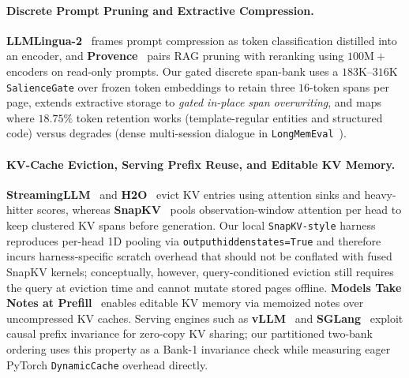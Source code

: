 \documentclass[11pt]{article}
\renewcommand{\_}{\origunderscore\allowbreak}
\begin{document}
\paragraph{Discrete Prompt Pruning and Extractive Compression.}
\textbf{LLMLingua-2}~\cite{pan2024llmlingua2} frames prompt compression as token classification distilled into an encoder, and \textbf{Provence}~\cite{chirkova2025provence} pairs RAG pruning with reranking using $100\text{M}+$ encoders on read-only prompts. Our gated discrete span-bank uses a $183\text{K}$--$316\text{K}$ \texttt{SalienceGate} over frozen token embeddings to retain three $16$-token spans per page, extends extractive storage to \emph{gated in-place span overwriting}, and maps where $18.75\%$ token retention works (template-regular entities and structured code) versus degrades (dense multi-session dialogue in \texttt{LongMemEval}~\cite{wu2025longmemeval}).

\paragraph{KV-Cache Eviction, Serving Prefix Reuse, and Editable KV Memory.}
\textbf{StreamingLLM}~\cite{xiao2024streamingllm} and \textbf{H2O}~\cite{zhang2023h2o} evict KV entries using attention sinks and heavy-hitter scores, whereas \textbf{SnapKV}~\cite{li2024snapkv} pools observation-window attention per head to keep clustered KV spans before generation. Our local \texttt{SnapKV-style} harness reproduces per-head 1D pooling via \texttt{output\_hidden\_states=True} and therefore incurs harness-specific scratch overhead that should not be conflated with fused SnapKV kernels; conceptually, however, query-conditioned eviction still requires the query at eviction time and cannot mutate stored pages offline. \textbf{Models Take Notes at Prefill}~\cite{li2026notes} enables editable KV memory via memoized notes over uncompressed KV caches. Serving engines such as \textbf{vLLM}~\cite{kwon2023vllm} and \textbf{SGLang}~\cite{zheng2024sglang} exploit causal prefix invariance for zero-copy KV sharing; our partitioned two-bank ordering uses this property as a Bank-1 invariance check while measuring eager PyTorch \texttt{DynamicCache} overhead directly.
\end{document}
